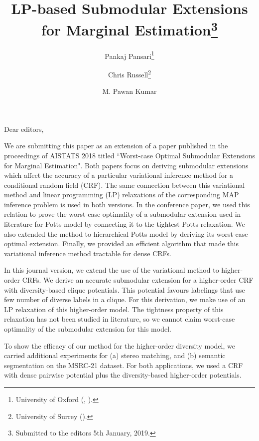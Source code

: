 \documentclass[review,onefignum,onetabnum]{siamonline171218}
\title{LP-based Submodular Extensions for Marginal Estimation\thanks{Submitted to the editors 5th January, 2019.}}
\author{Pankaj Pansari\thanks{University of Oxford
  (\email{pankaj@robots.ox.ac.uk}, \email{pawan@robots.ox.ac.uk}).}
\and Chris Russell\thanks{University of Surrey
  (\email{crussell@turing.ac.uk}).}
\and M. Pawan Kumar\footnotemark[2]}
\begin{document}
\maketitle

Dear editors,

We are submitting this paper as an extension of a paper published in the
proceedings of AISTATS 2018 titled ``Worst-case Optimal Submodular Extensions
for Marginal Estimation". Both papers focus on deriving submodular
extensions which affect the accuracy of a particular variational inference
method for a conditional random field (CRF). The same connection between this
variational method and linear programming (LP) relaxations of the corresponding
MAP inference problem is used in both versions. In the conference paper, we
used this relation to prove the worst-case optimality of a submodular
extension used in literature for Potts model by connecting it to the tightest
Potts relaxation. We also extended the method to hierarchical Potts model by
deriving its worst-case optimal extension. Finally, we provided an efficient
algorithm that made this variational inference method tractable for dense CRFs.

In this journal version, we extend the use of the variational method to
higher-order CRFs. We derive an accurate submodular extension for
a higher-order CRF with diversity-based clique potentials. This potential favours
labelings that use few number of diverse labels in a clique. For this
derivation, we make use of an LP relaxation of this higher-order model. The
tightness property of this relaxation has not been studied in literature, so we
cannot claim worst-case optimality of the submodular extension for this model.

To show the efficacy of our method for the higher-order diversity model, we
carried additional experiments for (a) stereo matching, and (b) semantic
segmentation on the MSRC-21 dataset. For both applications, we used a CRF with
dense pairwise potential plus the diversity-based higher-order potentials.
\end{document}
